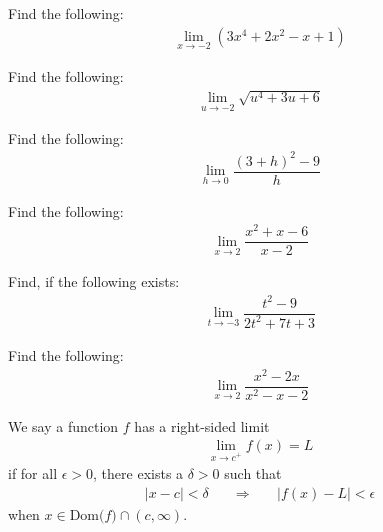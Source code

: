 \begin{exercise}
Find the following:
\begin{align*}
\lim_{x \longrightarrow -2} (3x^{4}+2x^{2}-x+1)
\end{align*}
\end{exercise}

\begin{exercise}
Find the following:
\begin{align*}
\lim_{u \longrightarrow -2} \sqrt{u^4 + 3u + 6}
\end{align*}
\end{exercise}

\begin{exercise} Find the following:
\begin{align*}
    \lim_{h \longrightarrow 0} \dfrac{(3+h)^{2} - 9}{h}
\end{align*}
\end{exercise}

\begin{exercise}
Find the following:
\begin{align*}
    \lim_{x \longrightarrow 2} \dfrac{x^{2}+x-6}{x-2}
\end{align*}
\end{exercise}

\begin{exercise}
Find, if the following exists:
\begin{align*}
  \lim_{t \longrightarrow -3} \dfrac{t^{2} - 9}{2t^{2} + 7t + 3}
\end{align*}
\end{exercise}

\begin{exercise}
Find the following:
\begin{align*}
    \lim_{x \longrightarrow 2} \dfrac{x^{2}-2x}{x^{2}-x-2}
\end{align*}
\end{exercise}

\begin{definition}
We say a function $f$ has a right-sided limit
\begin{align*}
    \lim_{x \longrightarrow c^{+}} f(x) = L
\end{align*}
if for all $\epsilon > 0$, there exists a $\delta > 0$ such that
\begin{align*}
    \lvert x - c \rvert < \delta \hspace{20pt} \Longrightarrow \hspace{20pt} \lvert f(x) - L \rvert < \epsilon
\end{align*}
when $x \in \text{Dom($f$)} \cap (c, \infty)$.
\end{definition}

